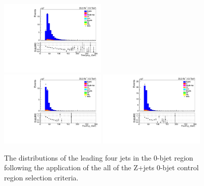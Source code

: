 \begin{figure}[!ht]
\includegraphics[width=0.45\textwidth]{figs/background-estimation/plots/unblinded/DY_control_old_prompt_mumu_ttbarInc/thirdJetPt_SingleTop_wMass_mumu.pdf}
\\
\includegraphics[width=0.45\textwidth]{figs/background-estimation/plots/unblinded/DY_control_old_prompt_ee_ttbarInc/fourthJetPt_SingleTop_wMass_ee.pdf}
\includegraphics[width=0.45\textwidth]{figs/background-estimation/plots/unblinded/DY_control_old_prompt_mumu_ttbarInc/fourthJetPt_SingleTop_wMass_mumu.pdf}
\caption{
The distributions of the leading four jets \pt in the 0-bjet region following the application of the all of the Z+jets 0-bjet control region selection criteria.
}
\label{fig:CR_LO_jetPt_wMass}
\end{figure}

